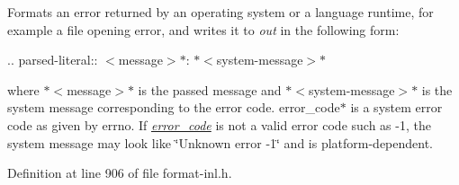Formats an error returned by an operating system or a language runtime, for example a file opening error, and writes it to {\itshape out} in the following form\+:

.. parsed-\/literal\+:\+: $<$message$>$$\ast$\+: $\ast$$<$system-\/message$>$$\ast$

where $\ast$$<$message$>$$\ast$ is the passed message and $\ast$$<$system-\/message$>$$\ast$ is the system message corresponding to the error code. error\+\_\+code$\ast$ is a system error code as given by {\ttfamily errno}. If {\itshape \hyperlink{classerror__code}{error\+\_\+code}} is not a valid error code such as -\/1, the system message may look like \char`\"{}\+Unknown error -\/1\char`\"{} and is platform-\/dependent.  

Definition at line 906 of file format-\/inl.\+h.

